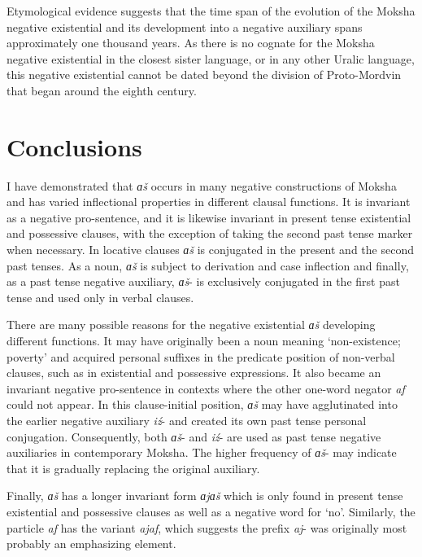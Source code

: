 \documentclass[output=paper]{langsci/langscibook}
\begin{document}
  Etymological evidence suggests that the time span of the evolution of the Moksha negative existential and its development into a negative auxiliary spans approximately one thousand years. As there is no cognate for the Moksha negative existential in the closest sister language,  or in any other Uralic language, this negative existential cannot be dated beyond the division of Proto-Mordvin that began around the eighth century.

\section{Conclusions}\label{sec:2:8}

I have demonstrated that \textit{ɑš} occurs in many negative constructions of Moksha and has varied inflectional properties in different clausal functions. It is invariant as a negative pro-sentence, and it is likewise invariant in present tense existential and possessive clauses, with the exception of taking the second past tense marker when necessary. In locative clauses \textit{ɑš} is conjugated in the present and the second past tenses. As a noun, \textit{ɑš} is subject to derivation and case inflection and finally, as a past tense negative auxiliary, \textit{ɑš}- is exclusively conjugated in the first past tense and used only in verbal clauses. 

  There are many possible reasons for the negative existential \textit{ɑš} developing different functions. It may have originally been a noun meaning `non-existence; poverty' and acquired personal suffixes in the predicate position of non-verbal clauses, such as in existential and possessive expressions. It also became an invariant negative pro-sentence in contexts where the other one-word negator \textit{af} could not appear. In this clause-initial position, \textit{ɑš} may have agglutinated into the earlier negative auxiliary \textit{iź}- and created its own past tense personal conjugation. Consequently, both \textit{ɑš}- and \textit{iź}- are used as past tense negative auxiliaries in contemporary Moksha. The higher frequency of \textit{ɑš}- may indicate that it is gradually replacing the original auxiliary.

  Finally, \textit{ɑš} has a longer invariant form \textit{ɑjɑš} which is only found in present tense existential and possessive clauses as well as a negative word for `no'. Similarly, the particle \textit{af} has the variant \textit{ajaf}, which suggests the prefix \textit{aj}- was originally most probably an emphasizing element.
\end{document}
